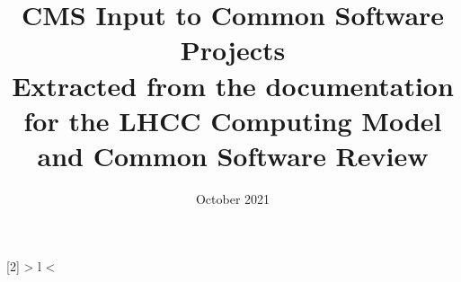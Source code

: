 \documentclass{article}
\title{CMS Input to Common Software Projects\\Extracted from the documentation for the LHCC Computing Model and Common Software Review}
\date{October 2021}
\begin{document}
\newcolumntype{R}[2]{%
    >{\bgroup}%
    l%
    <{\egroup}%
}
\newcommand*\rot{\multicolumn{1}{R{90}{1em}}}


\begin{titlepage}
\maketitle
\end{titlepage}



\newpage
\printbibliography
\end{document}
